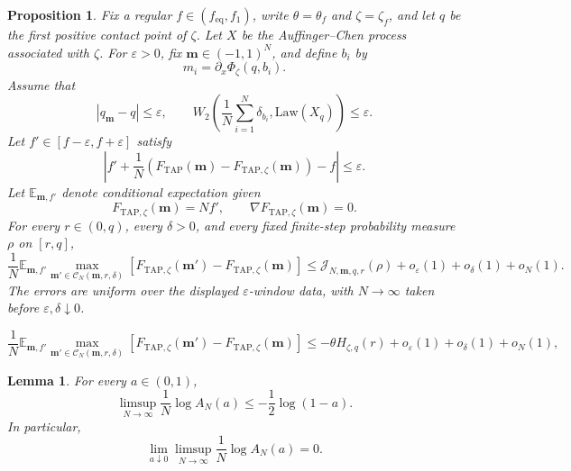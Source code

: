\documentclass[10pt,a4paper]{amsart}
\newtheorem{proposition}{Proposition}
\newtheorem{lemma}{Lemma}
\newcommand{\Law}{\mathrm{Law}}
\newcommand{\TAP}{\mathrm{TAP}}
\newcommand{\bfm}{\mathbf{m}}
\newcommand{\dE}{\mathbb{E}}%
\newcommand{\eq}{\mathrm{eq}}
\newcommand{\mc}{\mathcal}
\newcommand{\ve}{\varepsilon}
\begin{document}
	\begin{proposition}\label{prop:sibling-guerra-bound}
		Fix a regular \(f\in(f_{\eq},f_1)\), write
		\(\theta=\theta_f\) and \(\zeta=\zeta_f\), and let \(q\) be the first
		positive contact point of \(\zeta\). Let \(X\) be the
		Auffinger--Chen process associated with \(\zeta\).
		For \(\ve>0\), fix \(\bfm\in(-1,1)^N\), and define \(b_i\) by
		\[
		m_i=\partial_x\Phi_\zeta(q,b_i).
		\]
		Assume that
		\[
		|q_\bfm-q|\le\ve,
		\qquad
		W_2\left(
		\frac1N\sum_{i=1}^N\delta_{b_i},
		\Law(X_q)
		\right)\le\ve.
		\]
		Let \(f'\in[f-\ve,f+\ve]\) satisfy
		\[
		\left|
		f'
		+\frac1N\left(
		F_{\TAP}(\bfm)-F_{\TAP,\zeta}(\bfm)
		\right)
		-f
		\right|
		\le\ve.
		\]
		Let \(\dE_{\bfm,f'}\) denote conditional expectation given
		\[
		F_{\TAP,\zeta}(\bfm)=Nf',
		\qquad
		\nabla F_{\TAP,\zeta}(\bfm)=0.
		\]
		For every \(r\in(0,q)\),
		every \(\delta>0\), and every fixed finite-step probability measure
		\(\rho\) on \([r,q]\),
		\begin{equation}\label{eq:sibling-guerra-bound}
			\frac1N\dE_{\bfm,f'}
			\max_{\bfm'\in\mc C_N(\bfm,r,\delta)}
			\left[
			F_{\TAP,\zeta}(\bfm')-F_{\TAP,\zeta}(\bfm)
			\right]
			\le
			\mc J_{N,\bfm,q,r}(\rho)
			+o_\ve(1)+o_\delta(1)+o_N(1).
		\end{equation}
		The errors are uniform over the displayed \(\ve\)-window data,
		with \(N\to\infty\) taken before
		\(\ve,\delta\downarrow0\).
	\end{proposition}

	\begin{equation}\label{eq:sibling-nonpositive-bound}
		\frac1N\dE_{\bfm,f'}
		\max_{\bfm'\in\mc C_N(\bfm,r,\delta)}
		\left[
		F_{\TAP,\zeta}(\bfm')-F_{\TAP,\zeta}(\bfm)
		\right]
		\le
		-\theta H_{\zeta,q}(r)
		+o_\ve(1)+o_\delta(1)+o_N(1),
	\end{equation}

	\begin{lemma}
		\label{lem:one-sided-spherical-code}
		For every \(a\in(0,1)\),
		\begin{equation}\label{eq:one-sided-spherical-code-explicit}
			\limsup_{N\to\infty}
			\frac1N\log A_N(a)
			\le-\frac12\log(1-a).
		\end{equation}
		In particular,
		\begin{equation}\label{eq:one-sided-spherical-code}
			\lim_{a\downarrow0}
			\limsup_{N\to\infty}
			\frac1N\log A_N(a)=0.
		\end{equation}
	\end{lemma}
\end{document}
